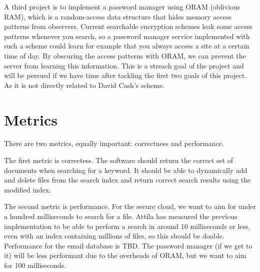 \documentclass[onecolumn, draftclsnofoot,10pt, compsoc]{IEEEtran}
\begin{document}



A third project is to implement a password manager using ORAM (oblivious RAM),
which is a random-access data structure that hides memory access patterns from observers.
Current searchable encryption schemes leak some access patterns whenever you search,
so a password manager service implemented with such a scheme could learn for example that you always access a site at a certain time of day.
By obscuring the access patterns with ORAM, we can prevent the server from learning this information. This is a streach goal
of the project and will be persued if we have time after tackling the first two goals of this project. As it is not directly
related to David Cash's scheme.


\section{Metrics}

There are two metrics, equally important: correctness and performance.


The first metric is correctess.
The software should return the correct set of documents when searching for a keyword.
It should be able to dynamically add and delete files from the search index and return correct search results using the modified index.


The second metric is performance.
For the secure cloud, we want to aim for under a hundred milliseconds to search for a file. %
Attila has measured the previous implementation to be able to perform a search in around 10 milliseconds or less, even with an index containing millions of files, so this should be doable.
Performance for the email database is TBD.
The password manager (if we get to it) will be less performant due to the overheads of ORAM, but we want to aim for 100 milliseconds.


{}
\end{document}
